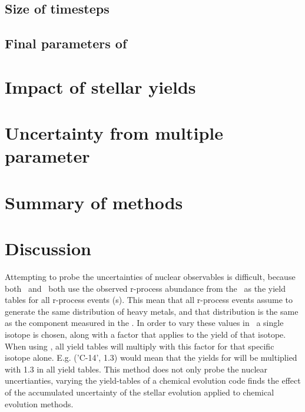 \subsection{Size of timesteps}
\subsection{Final parameters of \omegamodel}
\section{Impact of stellar yields}
\section{Uncertainty from multiple parameter}
\section{Summary of methods}
\section{Discussion}

\iffalse

Attempting to probe the uncertainties of nuclear observables is difficult, because both \eris\ and \omegamodel\ both use the observed r-process abundance from the \sos\ as the yield tables for all r-process events (\nsm\-s). This mean that all r-process events assume to generate the same distribution of heavy metals, and that distribution is the same as the component measured in the \sos.
In order to vary these values in \omegamodel\ a single isotope is chosen, along with a factor that applies to the yield of that isotope. When using \omegamodel, all yield tables will multiply with this factor for that specific isotope alone. E.g. ('C-14', 1.3) would mean that the yields for  will be multiplied with 1.3 in all yield tables.
This method does not only probe the nuclear uncertianties, varying the yield-tables of a chemical evolution code finds the effect of the accumulated uncertainty of the stellar evolution applied to chemical evolution methods.

